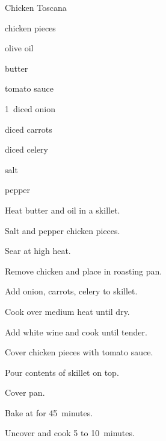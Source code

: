 \begin{recipe}{Chicken Toscana}{}{}

\begin{ingredients}
\item chicken pieces
\item olive oil
\item butter
\item tomato sauce
\item 1~diced onion
\item diced carrots
\item diced celery
\item salt
\item pepper
\end{ingredients}

\begin{directions}
\item Heat butter and oil in a skillet.
\item Salt and pepper chicken pieces.
\item Sear at high heat.
\item Remove chicken and place in roasting pan.
\item Add onion, carrots, celery to skillet.
\item Cook over medium heat until dry.
\item Add white wine and cook until tender.
\item Cover chicken pieces with tomato sauce.
\item Pour contents of skillet on top.
\item Cover pan.
\item Bake at  for 45~minutes.
\item Uncover and cook 5 to 10~minutes.
\end{directions}

\end{recipe}
